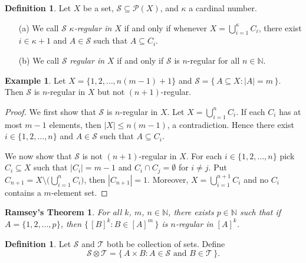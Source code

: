 \documentclass[12pt]{article}
\theoremstyle{plain}
\newtheorem*{ramsey}{Ramsey's Theorem}
\theoremstyle{definition}
\newtheorem{defn}[thm]{Definition}
\newtheorem{example}[thm]{Example}
\newcommand{\bbN}{\mathbb{N}}
\newcommand{\calP}{\mathcal{P}}
\newcommand{\calS}{\mathcal{S}}
\newcommand{\calT}{\mathcal{T}}
\begin{document}
\begin{defn}
  Let $X$ be a set, $\calS \subseteq \calP(X)$, and $\kappa$ a
  cardinal number.
  \begin{itemize}
    \item[(a)] We call $\calS$ \textsl{\mbox{$\kappa$-regular} in $X$}
      if and only if whenever $X = \bigcup_{i=1}^\kappa C_i$, there
      exist $i \in \kappa+1$ and $A \in \calS$ such that $A \subseteq
      C_i$.

    \item[(b)] We call $\calS$ \textsl{regular in $X$} if and only if
      $\calS$ is \mbox{$n$-regular} for all $n \in \bbN$.
  \end{itemize}
\end{defn}

\begin{example}
  Let $X = \{1, 2, \ldots, n(m-1) + 1\}$ and $\calS = \{\, A \subseteq
  X : |A| = m \,\}$.
  Then $\calS$ is \mbox{$n$-regular} in $X$ but not
  \mbox{$(n+1)$-regular}.
\end{example}
\begin{proof}
  We first show that $\calS$ is \mbox{$n$-regular} in $X$.
  Let $X = \bigcup_{i=1}^n C_i$.
  If each $C_i$ has at most $m-1$ elements, then $|X| \le n(m-1)$, a
  contradiction. 
  Hence there exist $i \in \{1, 2, \ldots, n\}$ and $A \in \calS$ such
  that $A \subseteq C_i$.

  We now show that $\calS$ is not \mbox{$(n+1)$-regular} in $X$.
  For each $i \in \{1, 2, \ldots, n\}$ pick $C_i \subseteq X$ such
  that $|C_i| = m-1$ and $C_i \cap C_j = \emptyset$ for $i \ne j$.
  Put $C_{n+1} = X \setminus \bigl(\bigcup_{i=1}^n C_i\bigr)$, then
  $|C_{n+1}| = 1$. 
  Moreover, $X = \bigcup_{i=1}^{n+1} C_i$ and no $C_i$ contains a
  \mbox{$m$-element} set.
\end{proof}

\begin{ramsey}
  For all $k$, $m$, $n \in \bbN$, there exists $p \in \bbN$ such that
  if $A = \{1, 2, \ldots, p\}$, then $\bigl\{\, [B]^k : B \in [A]^m
  \,\bigr\}$ is \mbox{$n$-regular} in $[A]^k$.
\end{ramsey}

\begin{defn}
  Let $\calS$ and $\calT$ both be collection of sets.
  Define
  \[
    \calS \otimes \calT = \{\, A \times B : \mbox{$A \in \calS$ and
      $B \in \calT$} \,\}.
  \]
\end{defn}
\end{document}

